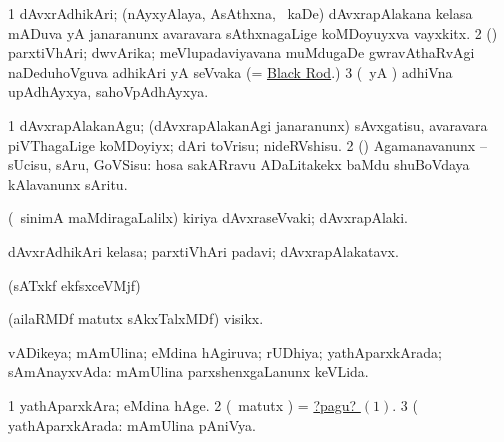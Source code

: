 \bentry
{} 
\gl{\nA}
\expl{}
\bmng
\bnum
\num{1} dAvxrAdhikAri; (nAyxyAlaya, AsAthxna, \mo\ kaDe) dAvxrapAlakana kelasa mADuva yA janaranunx avaravara sAthxnagaLige koMDoyuyxva vayxkitx. 
\num{2} (\birx) parxtiVhAri; dwvArika; meVlupadaviyavana muMdugaDe gwravAthaRvAgi naDeduhoVguva adhikAri yA seVvaka (= \hyperref{kandict_b.pdf}{B}{Black Rod}{Black Rod}.) 
\num{3} (\pArxparx\ yA \hA) adhiVna upAdhAyxya, sahoVpAdhAyxya. 
\enum
\emng
\eentry

\bentry
{} 
\gl{\sakirx}
\expl{}
\bmng
\bnum
\num{1} dAvxrapAlakanAgu; (dAvxrapAlakanAgi janaranunx) sAvxgatisu, avaravara piVThagaLige koMDoyiyx; dAri toVrisu; nideRVshisu. 
\num{2} (\rUpa) Agamanavanunx -- sUcisu, sAru, GoVSisu:  hosa sakARravu ADaLitakekx baMdu shuBoVdaya kAlavanunx sAritu. 
\enum
\emng
\eentry

\bentry
{} 
\gl{\nA}
\expl{}
\bmng
(\kanmu\ sinimA maMdiragaLalilx) kiriya dAvxraseVvaki; dAvxrapAlaki. 
\emng
\eentry

\bentry
{} 
\gl{\nA}
\expl{}
\bmng
dAvxrAdhikAri kelasa; parxtiVhAri padavi; dAvxrapAlakatavx. 
\emng
\eentry

\bentry
{}
\gl{\saMkiSx}
\expl{}
\bmng
(sATxkf ekfsxceVMjf)  
\emng
\eentry

\bentry
{}
\gl{\saMkiSx}
\expl{}
\bmng
{} 
\emng
\eentry

\bentry
{} 
\gl{\nA}
\expl{}
\bmng
(ailaRMDf matutx sAkxTalxMDf) visikx. 
\emng
\eentry

\bentry
{}
\gl{\saMkiSx}
\expl{}
\bmng
{} 
\emng
\eentry

\bentry
{}
\gl{\saMkiSx}
\expl{}
\bmng
{} 
\emng
\eentry

\bentry
{} 
\gl{\gu}
\bmng
vADikeya; mAmUlina; eMdina hAgiruva; rUDhiya; yathAparxkArada; sAmAnayxvAda:  mAmUlina parxshenxgaLanunx keVLida. 
\emng

\noindent
\gl{\pagu}
\expl{}
\bmng
\hypertarget{usual pagu1}{} 
\bnum
\num{1}  yathAparxkAra; eMdina hAge. 
\num{2}  (\gArx\ matutx \hA) = \hyperlink{usual pagu1}{?pagu? \((1)\)}. 
\num{3}  (  yathAparxkArada:  mAmUlina pAniVya. 
\enum
\emng
\eentry

